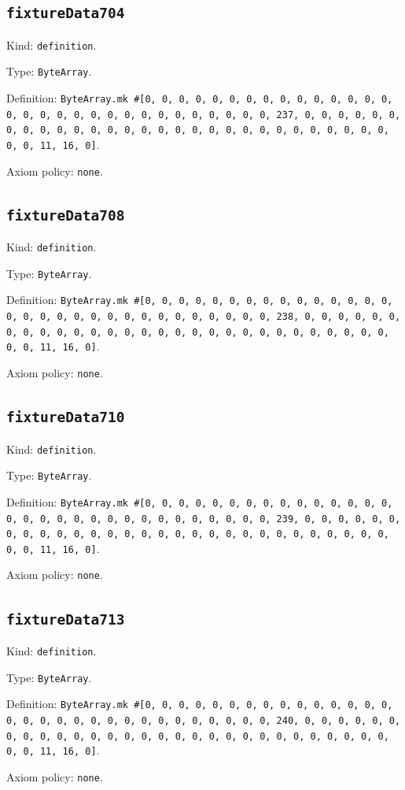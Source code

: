 \documentclass[11pt]{article}
\begin{document}
\subsection*{\texttt{fixtureData704}}
\noindent Kind: \texttt{definition}.\par
\noindent Type: \texttt{ByteArray}.\par
\noindent Definition: \texttt{ByteArray.mk \#[0, 0, 0, 0, 0, 0, 0, 0, 0, 0, 0, 0, 0, 0, 0, 0, 0, 0, 0, 0, 0, 0, 0, 0, 0, 0, 0, 0, 0, 0, 0, 237, 0, 0, 0, 0, 0, 0, 0, 0, 0, 0, 0, 0, 0, 0, 0, 0, 0, 0, 0, 0, 0, 0, 0, 0, 0, 0, 0, 0, 0, 0, 0, 11, 16, 0]}.\par
\noindent Axiom policy: \texttt{none}.\par
\subsection*{\texttt{fixtureData708}}
\noindent Kind: \texttt{definition}.\par
\noindent Type: \texttt{ByteArray}.\par
\noindent Definition: \texttt{ByteArray.mk \#[0, 0, 0, 0, 0, 0, 0, 0, 0, 0, 0, 0, 0, 0, 0, 0, 0, 0, 0, 0, 0, 0, 0, 0, 0, 0, 0, 0, 0, 0, 0, 238, 0, 0, 0, 0, 0, 0, 0, 0, 0, 0, 0, 0, 0, 0, 0, 0, 0, 0, 0, 0, 0, 0, 0, 0, 0, 0, 0, 0, 0, 0, 0, 11, 16, 0]}.\par
\noindent Axiom policy: \texttt{none}.\par
\subsection*{\texttt{fixtureData710}}
\noindent Kind: \texttt{definition}.\par
\noindent Type: \texttt{ByteArray}.\par
\noindent Definition: \texttt{ByteArray.mk \#[0, 0, 0, 0, 0, 0, 0, 0, 0, 0, 0, 0, 0, 0, 0, 0, 0, 0, 0, 0, 0, 0, 0, 0, 0, 0, 0, 0, 0, 0, 0, 239, 0, 0, 0, 0, 0, 0, 0, 0, 0, 0, 0, 0, 0, 0, 0, 0, 0, 0, 0, 0, 0, 0, 0, 0, 0, 0, 0, 0, 0, 0, 0, 11, 16, 0]}.\par
\noindent Axiom policy: \texttt{none}.\par
\subsection*{\texttt{fixtureData713}}
\noindent Kind: \texttt{definition}.\par
\noindent Type: \texttt{ByteArray}.\par
\noindent Definition: \texttt{ByteArray.mk \#[0, 0, 0, 0, 0, 0, 0, 0, 0, 0, 0, 0, 0, 0, 0, 0, 0, 0, 0, 0, 0, 0, 0, 0, 0, 0, 0, 0, 0, 0, 0, 240, 0, 0, 0, 0, 0, 0, 0, 0, 0, 0, 0, 0, 0, 0, 0, 0, 0, 0, 0, 0, 0, 0, 0, 0, 0, 0, 0, 0, 0, 0, 0, 11, 16, 0]}.\par
\noindent Axiom policy: \texttt{none}.\par
\end{document}
